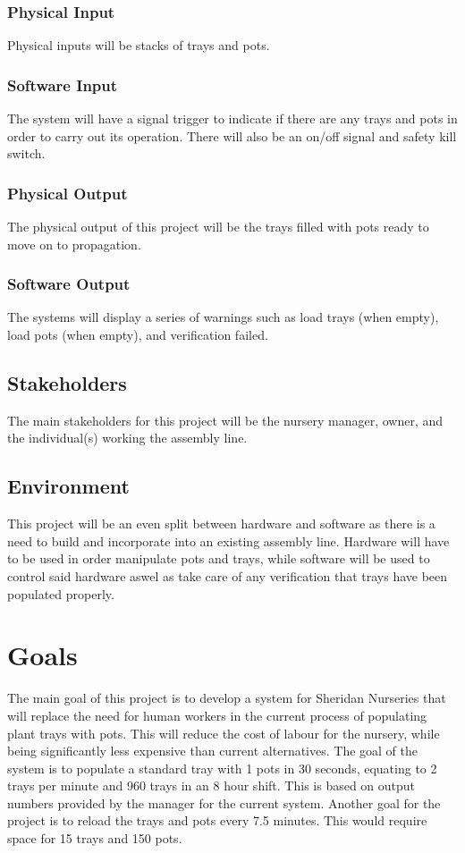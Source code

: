 \documentclass{article}
\begin{document}
\subsubsection{Physical Input}

Physical inputs will be stacks of trays and pots.
\subsubsection{Software Input}
The system will have a signal trigger to indicate if there are any trays and pots in order to carry out its operation. 
There will also be an on/off signal and safety kill switch.
\subsubsection{Physical Output}
The physical output of this project will be the trays filled with pots ready to move on to propagation.
\subsubsection{Software Output}
The systems will display a series of warnings such as load trays (when empty), load pots (when empty), 
and verification failed.


\subsection{Stakeholders}
The main stakeholders for this project will be the nursery manager, 
owner, and the individual(s) working the assembly line.

\subsection{Environment}
This project will be an even split between hardware and software as there is a need to build and incorporate into an existing assembly line.
Hardware will have to be used in order manipulate pots and trays, while software will be used to control said hardware 
aswel as take care of any verification that trays have been populated properly.
\section{Goals}
The main goal of this project is to develop a system for Sheridan Nurseries
that will replace the need for human workers in the current process of populating plant trays with pots. This will reduce the cost
of labour for the nursery, while being significantly less expensive than current alternatives. The goal of the system is to populate 
a standard tray with 1 pots in 30 seconds, equating to 2 trays per minute and 960 trays in an 8 hour shift. This is based on output 
numbers provided by the manager for the current system. Another goal for the project is to reload the trays and pots every 7.5 minutes.
This would require space for 15 trays and 150 pots.
\end{document}
